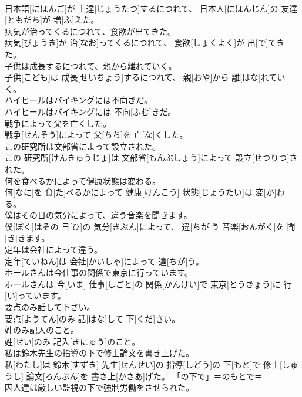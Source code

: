 \documentclass[8pt]{extreport}
\begin{document}
\begin{CJK}{UTF8}{min}
\\	日本語[にほんご]が 上達[じょうたつ]するにつれて、 日本人[にほんじん]の 友達[ともだち]が 増[ふ]えた。	
\\	病気が治ってくるにつれて、食欲が出てきた。	
\\	病気[びょうき]が 治[なお]ってくるにつれて、 食欲[しょくよく]が 出[で]てきた。	
\\	子供は成長するにつれて、親から離れていく。	
\\	子供[こども]は 成長[せいちょう]するにつれて、 親[おや]から 離[はな]れていく。	
\\	ハイヒールはバイキングには不向きだ。	
\\	ハイヒールはバイキングには 不向[ふむ]きだ。	
\\	戦争によって父を亡くした。	
\\	戦争[せんそう]によって 父[ちち]を 亡[な]くした。	
\\	この研究所は文部省によって設立された。	
\\	この 研究所[けんきゅうじょ]は 文部省[もんぶしょう]によって 設立[せつりつ]された。	
\\	何を食べるかによって健康状態は変わる。	
\\	何[なに]を 食[た]べるかによって 健康[けんこう] 状態[じょうたい]は 変[か]わる。	
\\	僕はその日の気分によって、違う音楽を聞きます。	
\\	僕[ぼく]はその 日[ひ]の 気分[きぶん]によって、 違[ちが]う 音楽[おんがく]を 聞[き]きます。	
\\	定年は会社によって違う。	
\\	定年[ていねん]は 会社[かいしゃ]によって 違[ちが]う。	
\\	ホールさんは今仕事の関係で東京に行っています。	
\\	ホールさんは 今[いま] 仕事[しごと]の 関係[かんけい]で 東京[とうきょう]に 行[い]っています。	
\\	要点のみ話して下さい。	
\\	要点[ようてん]のみ 話[はな]して 下[くだ]さい。	
\\	姓のみ記入のこと。	
\\	姓[せい]のみ 記入[きにゅう]のこと。	
\\	私は鈴木先生の指導の下で修士論文を書き上げた。	
\\	私[わたし]は 鈴木[すずき] 先生[せんせい]の 指導[しどう]の 下[もと]で 修士[しゅうし] 論文[ろんぶん]を 書き上[かきあ]げた。	「の下で」＝のもとで＝ 
\\	囚人達は厳しい監視の下で強制労働をさせられた。	

\end{CJK}
\end{document}
